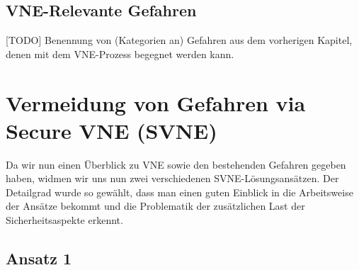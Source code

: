 \documentclass{lni}
\begin{document}




\subsection{VNE-Relevante Gefahren}
\label{subsec:gefahren_vnerelevant}	
[TODO] Benennung von (Kategorien an) Gefahren aus dem vorherigen Kapitel, denen mit dem VNE-Prozess begegnet werden kann.



\section{Vermeidung von Gefahren via Secure VNE (SVNE)}
\label{sec:svne}
Da wir nun einen Überblick zu VNE sowie den bestehenden Gefahren gegeben haben, widmen wir uns nun zwei verschiedenen SVNE-Lösungsansätzen. Der Detailgrad wurde so gewählt, dass man einen guten Einblick in die Arbeitsweise der Ansätze bekommt und die Problematik der zusätzlichen Last der Sicherheitsaspekte erkennt.

\subsection{Ansatz 1}
\end{document}
